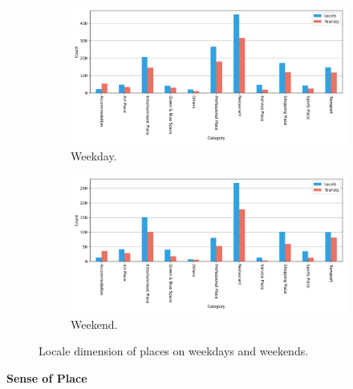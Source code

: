 \documentclass{article}
\theoremstyle{remark}
\begin{document}
\begin{figure}[!h]

\centering
\begin{subfigure}{0.6\textheight}
\centering
\includegraphics[width=0.9\linewidth]{figures/places_locale_weekday.png}
\caption{Weekday.}
\label{fig:places_locale_weekday}
\end{subfigure}
\begin{subfigure}{0.6\textheight}
\centering
\includegraphics[width=0.9\linewidth]{figures/places_locale_weekend.png}
\caption{Weekend.}
\label{fig:places_locale_weekend}
\end{subfigure}

\caption{Locale dimension of places on weekdays and weekends.}
\label{fig:places_locale_week}
\end{figure}


\textbf{Sense of Place}
\end{document}
